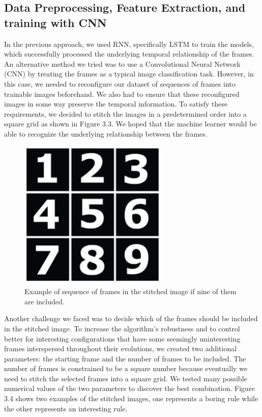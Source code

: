 \documentclass[12pt]{article}
\numberwithin{figure}{section} %
\begin{document}
\subsection{Data Preprocessing, Feature Extraction, and training with CNN}
In the previous approach, we used RNN, specifically LSTM to train the models, which successfully processed the underlying temporal relationship of the frames. An alternative method we tried was to use a Convolutional Neural Network (CNN) by treating the frames as a typical image classification task. However, in this case, we needed to reconfigure our dataset of sequences of frames into trainable images beforehand. We also had to ensure that these reconfigured images in some way preserve the temporal information. To satisfy these requirements, we decided to stitch the images in a predetermined order into a square grid as shown in Figure 3.3. We hoped that the machine learner would be able to recognize the underlying relationship between the frames. 
 
\begin{figure}[H]
\centering
\includegraphics[width=0.3\linewidth]{Section3/2}
\caption{Example of sequence of frames in the stitched image if nine of them are included.}
\vspace{-1.5em}
\end{figure}
Another challenge we faced was to decide which of the frames should be included in the stitched image. To increase the algorithm’s robustness and to control better for interesting configurations that have some seemingly uninteresting frames interspersed throughout their evolutions, we created two additional parameters: the starting frame and the number of frames to be included. The number of frames is constrained to be a square number because eventually we need to stitch the selected frames into a square grid. We tested many possible numerical values of the two parameters to discover the best combination.  Figure 3.4 shows two examples of the stitched images, one represents a boring rule while the other represents an interesting rule. 
\end{document}
